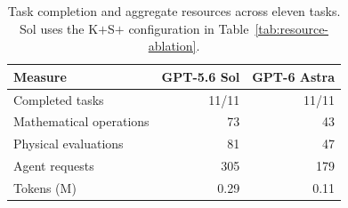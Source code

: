 \begin{table}[!htbp]
\centering
\caption{Task completion and aggregate resources across eleven tasks. Sol uses the K$+$S$+$ configuration in Table~\ref{tab:resource-ablation}.}
\label{tab:model-comparison}
\papertablestyle
\begin{tabular*}{\columnwidth}{@{\extracolsep{\fill}}lrr@{}}
\toprule
\textbf{Measure} & \textbf{GPT-5.6 Sol} & \textbf{GPT-6 Astra} \\
\midrule
Completed tasks & 11/11 & 11/11 \\
Mathematical operations & 73 & 43 \\
Physical evaluations & 81 & 47 \\
Agent requests & 305 & 179 \\
Tokens (M) & 0.29 & 0.11 \\
\bottomrule
\end{tabular*}
\end{table}
